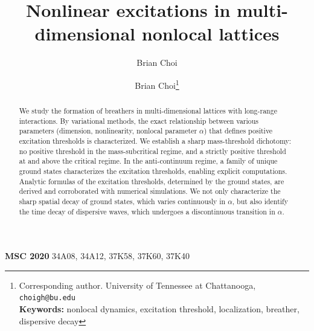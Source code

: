 \documentclass{article}
\title{\Large Nonlinear excitations in multi-dimensional nonlocal lattices\vspace{-1ex}}
\author{Brian Choi \vspace{-2ex}}
\author{Brian Choi\thanks{Corresponding author. University of Tennessee at Chattanooga, \texttt{choigh@bu.edu}\\
\textbf{Keywords:} nonlocal dynamics, excitation threshold, localization, breather, dispersive decay}
\vspace{-2ex}  }
\date{}
\numberwithin{equation}{section}
\begin{document}
\maketitle\vspace{-4ex}
\maketitle
\begin{abstract}
We study the formation of breathers in multi-dimensional lattices with long-range interactions. By variational methods, the exact relationship between various parameters (dimension, nonlinearity, nonlocal parameter $\alpha$) that defines positive excitation thresholds is characterized. We establish a sharp mass-threshold dichotomy: no positive threshold in the mass-subcritical regime, and a strictly positive threshold at and above the critical regime. In the anti-continuum regime, a family of unique ground states characterizes the excitation thresholds, enabling explicit computations. Analytic formulas of the excitation thresholds, determined by the ground states, are derived and corroborated with numerical simulations. We not only characterize the sharp spatial decay of ground states, which varies continuously in $\alpha$, but also identify the time decay of dispersive waves, which undergoes a discontinuous transition in $\alpha$.
\end{abstract}
\noindent \textbf{MSC 2020} 34A08, 34A12, 37K58, 37K60, 37K40


\end{document}
